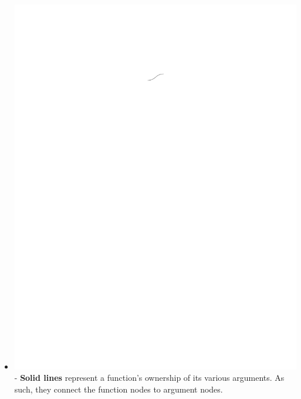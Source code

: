 \documentclass[conference]{IEEEtran}
\begin{document}
\begin{itemize}
		\item  \vspace{.25cm} \includegraphics{glossary-solidline} - \textbf{Solid lines} represent a
		function's ownership of its various arguments. As such, they connect the
		function nodes to argument nodes.
		

\end{itemize}
\end{document}
